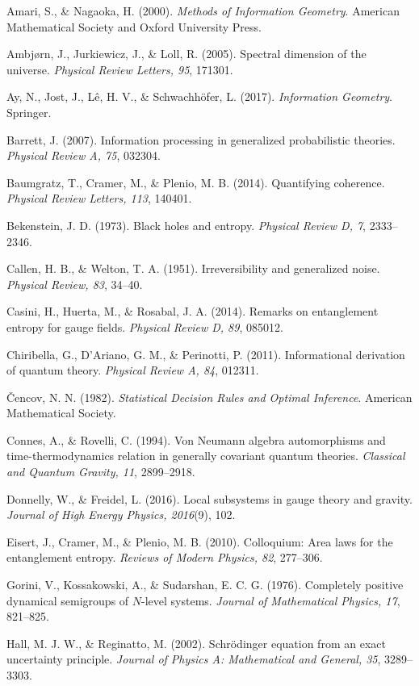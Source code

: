 \documentclass[
  11pt,
]{article}
\begin{document}
Amari, S., \& Nagaoka, H. (2000). \emph{Methods of Information
Geometry}. American Mathematical Society and Oxford University Press.

Ambjørn, J., Jurkiewicz, J., \& Loll, R. (2005). Spectral dimension of
the universe. \emph{Physical Review Letters, 95}, 171301.

Ay, N., Jost, J., Lê, H. V., \& Schwachhöfer, L. (2017).
\emph{Information Geometry}. Springer.

Barrett, J. (2007). Information processing in generalized probabilistic
theories. \emph{Physical Review A, 75}, 032304.

Baumgratz, T., Cramer, M., \& Plenio, M. B. (2014). Quantifying
coherence. \emph{Physical Review Letters, 113}, 140401.

Bekenstein, J. D. (1973). Black holes and entropy. \emph{Physical Review
D, 7}, 2333--2346.

Callen, H. B., \& Welton, T. A. (1951). Irreversibility and generalized
noise. \emph{Physical Review, 83}, 34--40.

Casini, H., Huerta, M., \& Rosabal, J. A. (2014). Remarks on
entanglement entropy for gauge fields. \emph{Physical Review D, 89},
085012.

Chiribella, G., D'Ariano, G. M., \& Perinotti, P. (2011). Informational
derivation of quantum theory. \emph{Physical Review A, 84}, 012311.

Čencov, N. N. (1982). \emph{Statistical Decision Rules and Optimal
Inference}. American Mathematical Society.

Connes, A., \& Rovelli, C. (1994). Von Neumann algebra automorphisms and
time-thermodynamics relation in generally covariant quantum theories.
\emph{Classical and Quantum Gravity, 11}, 2899--2918.

Donnelly, W., \& Freidel, L. (2016). Local subsystems in gauge theory
and gravity. \emph{Journal of High Energy Physics, 2016}(9), 102.

Eisert, J., Cramer, M., \& Plenio, M. B. (2010). Colloquium: Area laws
for the entanglement entropy. \emph{Reviews of Modern Physics, 82},
277--306.

Gorini, V., Kossakowski, A., \& Sudarshan, E. C. G. (1976). Completely
positive dynamical semigroups of \(N\)-level systems. \emph{Journal of
Mathematical Physics, 17}, 821--825.

Hall, M. J. W., \& Reginatto, M. (2002). Schrödinger equation from an
exact uncertainty principle. \emph{Journal of Physics A: Mathematical
and General, 35}, 3289--3303.
\end{document}
